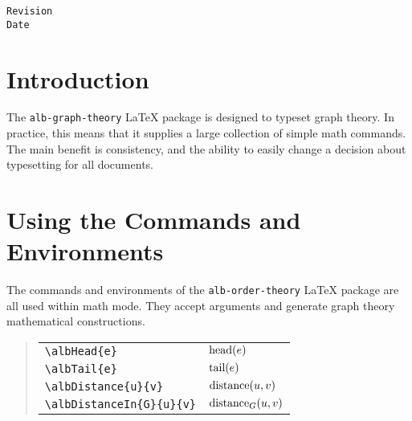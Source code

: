 \documentclass[11pt,a4paper,oneside,titlepage]{alb-corp}
\begin{document}
\begin{albTitlePage}

  \verb$Revision$\\
  \verb$Date$

\end{albTitlePage}




\section{Introduction}
\label{sec:alb-graph-theory-documentation:intr}

The \texttt{alb-graph-theory} \LaTeX{} package is designed to typeset
graph theory.  In practice, this means that it supplies a large
collection of simple math commands.  The main benefit is consistency,
and the ability to easily change a decision about typesetting for all
documents.




\section{Using the Commands and Environments}
\label{sec:alb-order-theory-documentation:using-comm-envir}

The commands and environments of the \texttt{alb-order-theory} \LaTeX{}
package are all used within math mode.  They accept arguments and
generate graph theory mathematical constructions.

\begin{quote}
  \begin{tabular}{p{}@{\qquad}p{}}
    \verb$\albHead{e}$ & $\operatorname{head}(e)$ \\
    \verb$\albTail{e}$ & $\operatorname{tail}(e)$ \\
    \verb$\albDistance{u}{v}$ & $\operatorname{distance}(u, v)$ \\
    \verb$\albDistanceIn{G}{u}{v}$ & $\albDistanceIn{G}{u}{v}$
  \end{tabular}
\end{quote}



\end{document}
